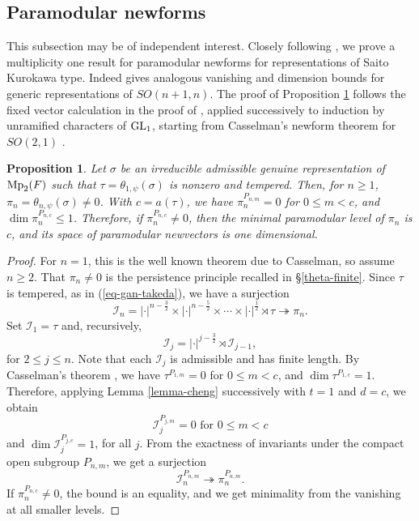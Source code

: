 \documentclass[12pt]{amsart}
\newtheorem{proposition}[theorem]{Proposition}
\theoremstyle{definition}
\theoremstyle{remark}
\begin{document}
\subsection{Paramodular newforms}\label{section-cheng}

This subsection may be of independent interest. Closely following \cite{che26}, we prove a multiplicity one result for paramodular newforms for representations of Saito Kurokawa type. Indeed \cite[Theorem A (1)]{che26} 
gives analogous vanishing and dimension bounds for generic representations of $SO(n+1,n)$. The proof of Proposition \ref{prop-cheng} follows the fixed vector calculation in the proof of \cite[Lemma 6.1]{che26}, applied successively to induction by unramified characters of ${\rm GL}_1$, starting from Casselman’s newform theorem for $SO(2,1)$ \cite{cas73}. 

\begin{proposition}\label{prop-cheng}
Let $\sigma$ be an irreducible admissible genuine representation of ${\rm Mp}_2(F)$ such that
$
\tau=\theta_{1,\psi}(\sigma)
$
is nonzero and tempered. Then, for $n\ge1$, $\pi_n=\theta_{n,\psi}(\sigma)\neq0$. With $c=a(\tau)$, we have 
$
\pi_n^{P_{n,m}}=0$ for $0\le m<c$, and $\dim\pi_n^{P_{n,c}}\le1$. 
Therefore, if $\pi_n^{P_{n,c}}\neq0$, then the minimal paramodular level of $\pi_n$ is $c$, and its space of paramodular newvectors is one dimensional.
\end{proposition}

\begin{proof}
For $n=1$, this is the well known theorem due to Casselman, so assume $n\ge2$. That $\pi_n \neq 0$ is the persistence principle recalled in \S \ref{theta-finite}. Since $\tau$ is tempered, as in (\ref{eq-gan-takeda}), we have a surjection
\[
\mathcal I_n
=
|\cdot|^{n-\frac{3}{2}}\times
|\cdot|^{n-\frac{5}{2}}\times\cdots\times
|\cdot|^{\frac{1}{2}}\rtimes\tau
\twoheadrightarrow\pi_n.
\]
Set $\mathcal I_1=\tau$ and, recursively,
\[
\mathcal I_j
=
|\cdot|^{j-\frac{3}{2}}\rtimes\mathcal I_{j-1},
\]
for $2\le j\le n$. Note that each $\mathcal I_j$ is admissible and has finite length. By Casselman’s theorem \cite{cas73}, we have $
\tau^{P_{1,m}}=0$ for $0\le m<c$, and $\dim\tau^{P_{1,c}}=1$. 
Therefore, applying Lemma \ref{lemma-cheng} successively with $t=1$ and $d=c$, we obtain
\[
\mathcal I_j^{P_{j,m}}=0 \mbox{~for~} 0\leq m<c \] 
and $\dim\mathcal I_j^{P_{j,c}}=1$, for all $j$. 
From the exactness of invariants under the compact open subgroup $P_{n,m}$, we get a surjection
\[
\mathcal I_n^{P_{n,m}}\twoheadrightarrow
\pi_n^{P_{n,m}}.\] If $\pi_n^{P_{n,c}}\neq0$, the bound is an equality, and we get minimality from the vanishing at all smaller levels.
\end{proof}
\end{document}
